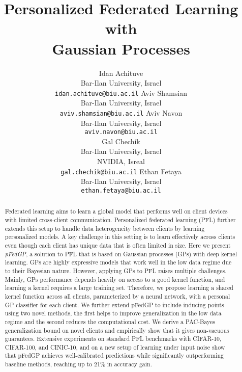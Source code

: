 \documentclass{article}
\title{Personalized Federated Learning with \\ Gaussian Processes}
\author{Idan Achituve \\Bar-Ilan University, Israel \\
  \texttt{idan.achituve@biu.ac.il}
\And
   Aviv Shamsian \\
   Bar-Ilan University, Israel \\
   \texttt{aviv.shamsian@biu.ac.il}
   \And
   Aviv Navon \\
   Bar-Ilan University, Israel \\
   \texttt{aviv.navon@biu.ac.il}\\
   \AND
   Gal Chechik \\
   Bar-Ilan University, Israel\\
   NVIDIA, Isreal \\
   \texttt{gal.chechik@biu.ac.il}
   \And
   Ethan Fetaya \\
   Bar-Ilan University, Israel\\
   \texttt{ethan.fetaya@biu.ac.il}
}
\begin{document}
\maketitle

\begin{abstract}
Federated learning aims to learn a global model that performs well on client devices with limited cross-client communication. Personalized federated learning (PFL) further extends this setup to handle data heterogeneity between clients by learning personalized models. A key challenge in this setting is to learn effectively across clients even though each client has unique data that is often limited in size. Here we present \textit{pFedGP}, a solution to PFL that is based on Gaussian processes (GPs) with deep kernel learning. GPs are highly expressive models that work well in the low data regime due to their Bayesian nature.
However, applying GPs to PFL raises multiple challenges. Mainly, GPs performance depends heavily on access to a good kernel function, and learning a kernel requires a large training set. Therefore, we propose learning a shared kernel function across all clients, parameterized by a neural network, with a personal GP classifier for each client. We further extend pFedGP to include inducing points using two novel methods, the first helps to improve generalization in the low data regime and the second reduces the computational cost. We derive a PAC-Bayes generalization bound on novel clients and empirically show that it gives non-vacuous guarantees. Extensive experiments on standard PFL benchmarks with CIFAR-10, CIFAR-100, and CINIC-10, and on a new setup of learning under input noise show that pFedGP achieves well-calibrated predictions while significantly outperforming baseline methods, reaching up to 21\% in accuracy gain.

\end{abstract}
\end{document}
